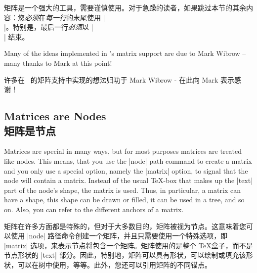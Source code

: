 矩阵是一个强大的工具，需要谨慎使用。对于急躁的读者，如果跳过本节的其余内容：您\emph{必须}在\emph{每一行}的末尾使用 |\\|。特别是，最后一行\emph{必须}以 |\\| 结束。

Many of the ideas implemented in \tikzname's matrix support are due to Mark
Wibrow -- many thanks to Mark at this point!

许多在 \tikzname\ 的矩阵支持中实现的想法归功于 Mark Wibrow - 在此向 Mark 表示感谢！
\subsection{Matrices are Nodes\\矩阵是节点}

Matrices are special in many ways, but for most purposes matrices are treated
like nodes. This means, that you use the |node| path command to create a matrix
and you only use a special option, namely the |matrix| option, to signal that
the node will contain a matrix. Instead of the usual \TeX-box that makes up the
|text| part of the node's shape, the matrix is used. Thus, in particular, a
matrix can have a shape, this shape can be drawn or filled, it can be used in a
tree, and so on. Also, you can refer to the different anchors of a matrix.

矩阵在许多方面都是特殊的，但对于大多数目的，矩阵被视为节点。这意味着您可以使用 |node| 路径命令创建一个矩阵，并且只需要使用一个特殊选项，即 |matrix| 选项，来表示节点将包含一个矩阵。矩阵使用的是整个 \TeX 盒子，而不是节点形状的 |text| 部分。因此，特别地，矩阵可以具有形状，可以绘制或填充该形状，可以在树中使用，等等。此外，您还可以引用矩阵的不同锚点。

